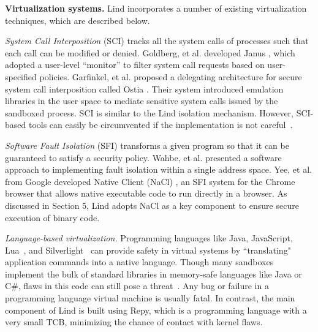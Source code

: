 
\noindent
\textbf{Virtualization systems.}
Lind incorporates a number of existing virtualization techniques, which are
described below.

\textit{System Call Interposition} (SCI) tracks all the system calls of processes such
that each call can be modified or denied.
Goldberg, et al. developed Janus \cite{Janus0:96, Janus:99},
which adopted a user-level ``monitor'' to filter system call requests based on
user-specified policies. Garfinkel, et al. proposed a delegating architecture for secure system call interposition
called Ostia \cite{SCI-04}. Their system introduced emulation libraries in the user space
to mediate sensitive system calls issued by the sandboxed process. SCI is similar to
 the Lind isolation mechanism. However, SCI-based tools can easily be circumvented
 if the implementation is not careful~\cite{Problems-SCI}.

\textit{Software Fault Isolation} (SFI) transforms a given program so that it can be guaranteed to satisfy a security policy.
Wahbe, et al. \cite{SFI:93} presented a software approach to implementing
fault isolation within a single address space.
Yee, et al. from Google developed Native Client (NaCl) \cite{NaCl-09},
an SFI system for the Chrome browser that allows native executable code to run directly in a
browser. As discussed in Section 5, Lind adopts NaCl as a key component to ensure secure execution
of binary code.

\textit{Language-based virtualization.}
Programming languages like Java, JavaScript, Lua~\cite{Lua}, and
Silverlight~\cite{Silverlight} can provide safety in virtual systems by
``translating" application commands into a native language.
%
Though many sandboxes implement the bulk of standard libraries in
memory-safe languages like Java or C\#, flaws in this code can
still pose a threat~\cite{JavaBugs, Java-Lessons}.
Any bug or failure in a programming language virtual
machine is usually fatal. In contrast, the main component of Lind
is built using Repy, which is a programming language with a very small TCB, minimizing the chance of contact with kernel flaws.

